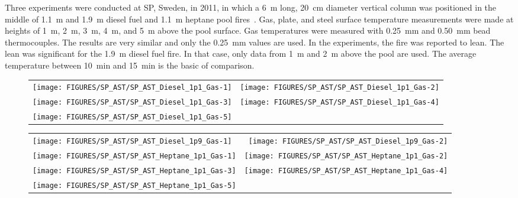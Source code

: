 \clearpage

Three experiments were conducted at SP, Sweden, in 2011, in which a 6~m long, 20~cm diameter vertical column was positioned in the middle of 1.1~m and 1.9~m diesel fuel and 1.1~m heptane pool fires~\cite{Sjostrom:AST}. Gas, plate, and steel surface temperature measurements were made at heights of 1~m, 2~m, 3~m, 4~m, and 5~m above the pool surface. Gas temperatures were measured with 0.25~mm and 0.50~mm bead thermocouples. The results are very similar and only the 0.25~mm values are used. In the experiments, the fire was reported to lean. The lean was significant for the 1.9~m diesel fuel fire. In that case, only data from 1~m and 2~m above the pool are used. The average temperature between 10~min and 15~min is the basic of comparison.

\begin{figure}[h!]
\begin{tabular*}{\textwidth}{l@{\extracolsep{\fill}}r}
\texttt{[image: FIGURES/SP\_AST/SP\_AST\_Diesel\_1p1\_Gas-1]}   &  \texttt{[image: FIGURES/SP\_AST/SP\_AST\_Diesel\_1p1\_Gas-2]}    \\
\texttt{[image: FIGURES/SP\_AST/SP\_AST\_Diesel\_1p1\_Gas-3]}   &  \texttt{[image: FIGURES/SP\_AST/SP\_AST\_Diesel\_1p1\_Gas-4]}     \\
\texttt{[image: FIGURES/SP\_AST/SP\_AST\_Diesel\_1p1\_Gas-5]}   &
\end{tabular*}
\label{SP_Diesel_1p1_Gas}
\end{figure}

\newpage

\begin{figure}[p]
\begin{tabular*}{\textwidth}{l@{\extracolsep{\fill}}r}
\texttt{[image: FIGURES/SP\_AST/SP\_AST\_Diesel\_1p9\_Gas-1]}   &  \texttt{[image: FIGURES/SP\_AST/SP\_AST\_Diesel\_1p9\_Gas-2]}    \\
\texttt{[image: FIGURES/SP\_AST/SP\_AST\_Heptane\_1p1\_Gas-1]}  &  \texttt{[image: FIGURES/SP\_AST/SP\_AST\_Heptane\_1p1\_Gas-2]}    \\
\texttt{[image: FIGURES/SP\_AST/SP\_AST\_Heptane\_1p1\_Gas-3]}  &  \texttt{[image: FIGURES/SP\_AST/SP\_AST\_Heptane\_1p1\_Gas-4]}     \\
\texttt{[image: FIGURES/SP\_AST/SP\_AST\_Heptane\_1p1\_Gas-5]}  &
\end{tabular*}
\label{SP_Diesel_1p9_Gas}
\end{figure}

